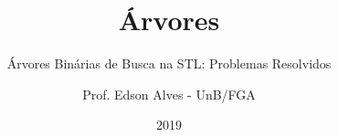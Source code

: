 \title{Árvores}
\subtitle{Árvores Binárias de Busca na STL: Problemas Resolvidos}
\author{Prof. Edson Alves - UnB/FGA}
\date{2019}
